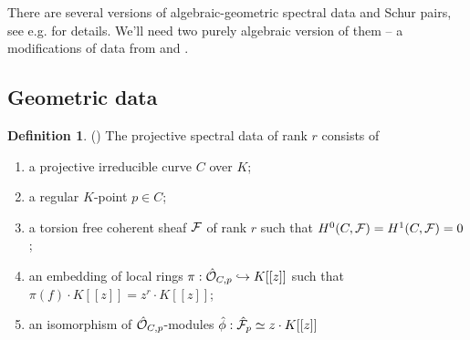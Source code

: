 \documentclass[11pt]{article}
\theoremstyle{definition}
\newtheorem{Def}{Definition}[section]
\theoremstyle{plain}
\numberwithin{equation}{section}
\newcommand{\co}{{{\cal O}}}
\newcommand{\cf}{{{\cal F}}}
\begin{document}
There are several versions of algebraic-geometric spectral data and Schur pairs, see e.g. \cite{Zheglov_book} for details. We'll need two purely algebraic version of them -- a modifications of data from \cite{Mu} and \cite{Q}. 

\subsection{Geometric data}
\label{S:geom_data}
 
\begin{Def}{(\cite[Def.9.25]{Zheglov_book})}
\label{D:proj_spec_data}
The projective spectral data of rank $r$ consists of
\begin{enumerate}
\item
a projective irreducible curve $C$ over $K$;
\item
a regular $K$-point $p\in C$;
\item
a torsion free coherent sheaf $\cf$ of rank $r$ such that $H^0(C, \cf )= H^1(C, \cf) =0$;
\item
an embedding of local rings $\pi :\hat{\co}_{C,p} \hookrightarrow K[[z]]$ such that $\pi (f)\cdot K[[z]]= z^r\cdot K[[z]]$;
\item
an isomorphism of $\hat{\co}_{C,p}$-modules $\hat{\phi}:\hat{\cf}_p \simeq z\cdot K[[z]]$
\end{enumerate}
\end{Def}
\end{document}
